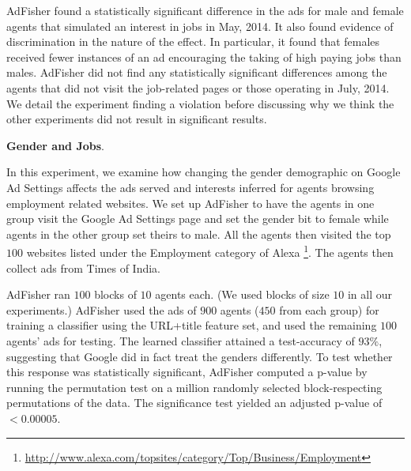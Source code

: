 \documentclass{article}
\makeatletter
\newcommand\gobblepars{\@ifnextchar\par {\expandafter\gobblepars\@gobble}{}}
\renewcommand{\paragraph}[1]{\smallskip\noindent\textbf{#1}.\ \ \gobblepars}
\newcommand{\ftnote}{\footnote}
\makeatother
\begin{document}
AdFisher found a statistically significant difference in the ads for male and female agents that simulated an interest in jobs in May, 2014.
It also found evidence of discrimination in the nature of the effect.  
In particular, 
it found that females received fewer instances of an ad encouraging the taking of high paying jobs than males.  
AdFisher did not find any statistically significant differences among the agents that did not visit the job-related pages or those operating in July, 2014.
We detail the experiment finding a violation before discussing why we think the other experiments did not result in significant results.


\paragraph{Gender and Jobs}
In this experiment, we examine how changing the gender demographic on Google Ad Settings affects the ads served and interests inferred for agents browsing employment related websites.
We set up AdFisher to have the agents in one group visit the Google Ad Settings page and set the gender bit to female while agents in the other group set theirs to male.
All the agents then visited the top $100$ websites listed under the Employment category of Alexa \ftnote{\url{http://www.alexa.com/topsites/category/Top/Business/Employment}}.
The agents then collect ads from Times of India.

AdFisher ran $100$ blocks of $10$ agents each. (We used blocks of size $10$ in all our experiments.)
AdFisher used the ads of $900$ agents ($450$ from each group) for training a classifier using the URL+title feature set, and used the remaining $100$ agents' ads for testing.  
The learned classifier attained a test-accuracy of $93\%$, suggesting that Google did in fact treat the genders differently.
To test whether this response was statistically significant, AdFisher computed a p-value by running the permutation test on a million randomly selected block-respecting permutations of the data.
The significance test yielded an adjusted p-value of $< 0.00005$. 
\end{document}
